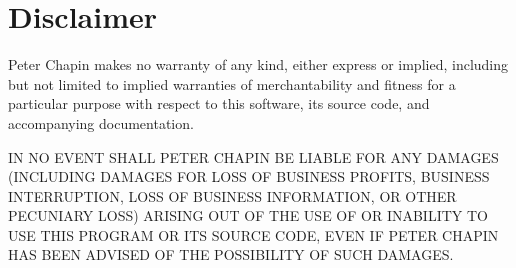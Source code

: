 \chapter{Disclaimer}

Peter Chapin makes no warranty of any kind, either express or implied, including but not limited
to implied warranties of merchantability and fitness for a particular purpose with respect to
this software, its source code, and accompanying documentation.

IN NO EVENT SHALL PETER CHAPIN BE LIABLE FOR ANY DAMAGES (INCLUDING DAMAGES FOR LOSS OF BUSINESS
PROFITS, BUSINESS INTERRUPTION, LOSS OF BUSINESS INFORMATION, OR OTHER PECUNIARY LOSS) ARISING
OUT OF THE USE OF OR INABILITY TO USE THIS PROGRAM OR ITS SOURCE CODE, EVEN IF PETER CHAPIN HAS
BEEN ADVISED OF THE POSSIBILITY OF SUCH DAMAGES.



